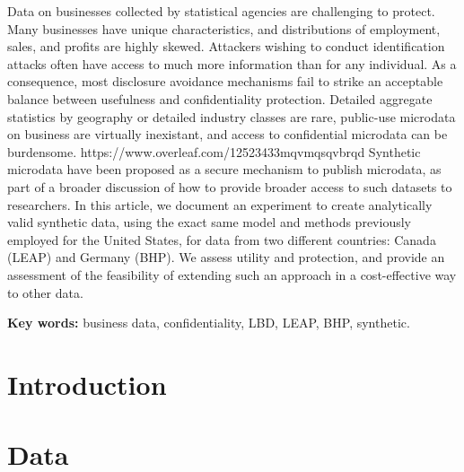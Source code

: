 \documentclass[10pt,twoside]{article}
\begin{document}
\begin{addmargin}[6mm]{6mm}
\begin{small}
\begin{singlespace}

Data on businesses collected by statistical agencies are challenging to protect. Many businesses have unique characteristics, and distributions of employment, sales, and profits are highly skewed. Attackers wishing to conduct identification attacks often have access to much more information than for any individual. As a consequence, most disclosure avoidance mechanisms  fail to strike an acceptable balance between usefulness and confidentiality protection. Detailed aggregate statistics by geography or detailed industry classes  are rare, public-use microdata on business are virtually inexistant, and access to confidential microdata can be burdensome. 
https://www.overleaf.com/12523433mqvmqsqvbrqd
Synthetic microdata have been proposed as a secure mechanism to publish microdata, as part of a broader discussion of how  to provide broader access to such datasets to researchers.
In this article, we document an experiment to create analytically valid synthetic data, using the exact same model and methods previously employed for the United States, for data from two different countries: Canada (\ac{LEAP}) and Germany (\ac{BHP}). We assess utility and protection, and provide an assessment of the feasibility of extending such an approach in a cost-effective way to other data.

\smallskip \noindent \textbf{Key words:} business data, confidentiality, LBD, LEAP, BHP, synthetic.

\end{singlespace}
\end{small}
\end{addmargin}

\smallskip

\section{Introduction}


\section{Data} 
\label{sec:data}


%
\end{document}
